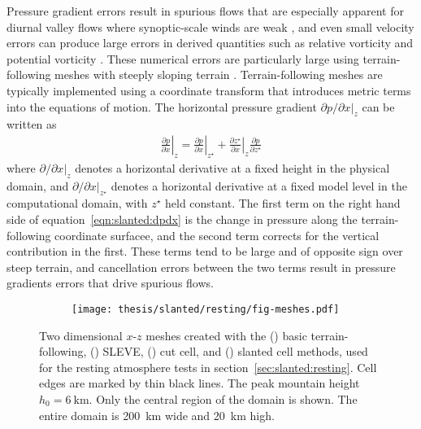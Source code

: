 Pressure gradient errors result in spurious flows that are especially apparent for diurnal valley flows where synoptic-scale winds are weak \citep{fast2003}, and even small velocity errors can produce large errors in derived quantities such as relative vorticity and potential vorticity \citep{hoinka-zaengl2004}.
These numerical errors are particularly large using terrain-following meshes with steeply sloping terrain \citep{zaengl2012}.
Terrain-following meshes are typically implemented using a coordinate transform that introduces metric terms into the equations of motion.  The horizontal pressure gradient $\left. \partial p / \partial x \right|_z$ can be written as \citep{mahrer1984}
\begin{align}
	\left. \frac{\partial p}{\partial x} \right|_z = 
	\left. \frac{\partial p}{\partial x} \right|_{z^\star} +
	\left. \frac{\partial z^\star}{\partial x} \right|_z
	\frac{\partial p}{\partial z^\star} \label{eqn:slanted:dpdx}
\end{align}
where $\left. \partial / \partial x \right|_z$ denotes a horizontal derivative at a fixed height in the physical domain, and $\left. \partial / \partial x \right|_{z^\star}$ denotes a horizontal derivative at a fixed model level in the computational domain, with $z^\star$ held constant.
The first term on the right hand side of equation~\eqref{eqn:slanted:dpdx} is the change in pressure along the terrain-following coordinate surfacee, and the second term corrects for the vertical contribution in the first.
These terms tend to be large and of opposite sign over steep terrain, and cancellation errors between the two terms result in pressure gradients errors that drive spurious flows.

\begin{figure}
	\centering
	\begin{subfigure}{\textwidth}
		\label{fig:slanted:resting:meshes:btf}
		\label{fig:slanted:resting:meshes:sleve}
		\label{fig:slanted:resting:meshes:cutCell}
		\label{fig:slanted:resting:meshes:slantedCell}
		\texttt{[image: thesis/slanted/resting/fig-meshes.pdf]}
	\end{subfigure}
%
	\caption{Two dimensional $x$-$z$ meshes created with the
	() basic terrain-following,
	() SLEVE,
	() cut cell, and
	() slanted cell methods, used for the resting atmosphere tests in section~\ref{sec:slanted:resting}.  Cell edges are marked by thin black lines.  The peak mountain height $h_0 = \SI{6}{\kilo\meter}$.
	Only the central region of the domain is shown.  The entire domain is \SI{200}{\kilo\meter} wide and \SI{20}{\kilo\meter} high.}
	\label{fig:slanted:resting:meshes}
\end{figure}

